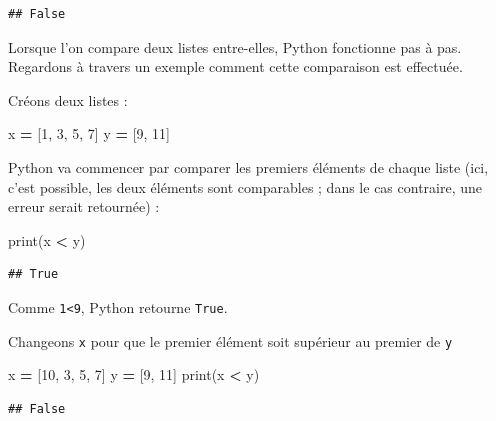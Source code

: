 \documentclass[12pt,]{book}
\newenvironment{Shaded}{\begin{snugshade}}{\end{snugshade}}
\newcommand{\DecValTok}[1]{\textcolor[rgb]{0.00,0.00,0.81}{#1}}
\newcommand{\OperatorTok}[1]{\textcolor[rgb]{0.81,0.36,0.00}{\textbf{#1}}}
\newcommand{\BuiltInTok}[1]{#1}
\newcommand{\NormalTok}[1]{#1}
\numberwithin{equation}{section}
\numberwithin{countremarque}{section}
\begin{document}
\begin{lstlisting}
## False
\end{lstlisting}

Lorsque l'on compare deux listes entre-elles, Python fonctionne pas à
pas. Regardons à travers un exemple comment cette comparaison est
effectuée.

Créons deux listes :

\begin{Shaded}
\begin{Highlighting}[]
\NormalTok{x }\OperatorTok{=}\NormalTok{ [}\DecValTok{1}\NormalTok{, }\DecValTok{3}\NormalTok{, }\DecValTok{5}\NormalTok{, }\DecValTok{7}\NormalTok{]}
\NormalTok{y }\OperatorTok{=}\NormalTok{ [}\DecValTok{9}\NormalTok{, }\DecValTok{11}\NormalTok{]}
\end{Highlighting}
\end{Shaded}

Python va commencer par comparer les premiers éléments de chaque liste
(ici, c'est possible, les deux éléments sont comparables ; dans le cas
contraire, une erreur serait retournée) :

\begin{Shaded}
\begin{Highlighting}[]
\BuiltInTok{print}\NormalTok{(x }\OperatorTok{<}\NormalTok{ y)}
\end{Highlighting}
\end{Shaded}

\begin{lstlisting}
## True
\end{lstlisting}

Comme \texttt{1\textless{}9}, Python retourne \texttt{True}.

Changeons \texttt{x} pour que le premier élément soit supérieur au
premier de \texttt{y}

\begin{Shaded}
\begin{Highlighting}[]
\NormalTok{x }\OperatorTok{=}\NormalTok{ [}\DecValTok{10}\NormalTok{, }\DecValTok{3}\NormalTok{, }\DecValTok{5}\NormalTok{, }\DecValTok{7}\NormalTok{]}
\NormalTok{y }\OperatorTok{=}\NormalTok{ [}\DecValTok{9}\NormalTok{, }\DecValTok{11}\NormalTok{]}
\BuiltInTok{print}\NormalTok{(x }\OperatorTok{<}\NormalTok{ y)}
\end{Highlighting}
\end{Shaded}

\begin{lstlisting}
## False
\end{lstlisting}
\end{document}

